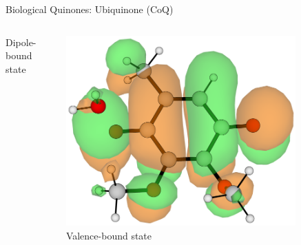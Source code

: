 \documentclass[9pt,t,xcolor=table]{beamer}
\begin{document}
\begin{frame}{\huge Biological Quinones: Ubiquinone (CoQ)}
\begin{columns}[b]
\begin{column}[b]{0.25\textwidth}
				\vspace{10pt}
				\small Dipole-bound state
			\end{column}
			\begin{column}[b]{0.25\textwidth}
				\centering
				\includegraphics[width=0.8\textwidth]{Figs/Q0_H2O_VBS.png}\\
				\vspace{25pt}
				\small Valence-bound state
			\end{column}
		\end{columns}
\end{frame}
\end{document}
